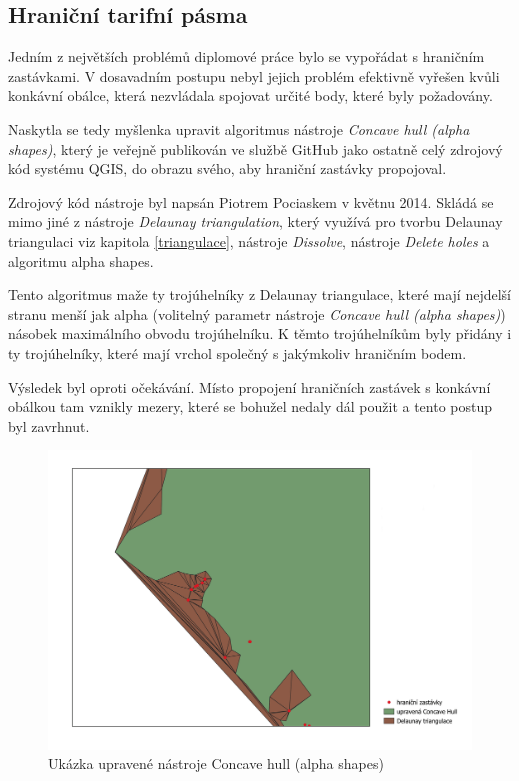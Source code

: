 \subsection{Hraniční tarifní pásma}
\label{hranice}

Jedním z největších problémů diplomové práce bylo se vypořádat s hraničním zastávkami.
V dosavadním postupu nebyl jejich problém efektivně vyřešen kvůli konkávní obálce,
která nezvládala spojovat určité body, které byly požadovány.

Naskytla se tedy myšlenka upravit algoritmus nástroje \textit{Concave hull (alpha shapes)},
který je veřejně publikován ve službě GitHub jako ostatně celý zdrojový kód systému QGIS, do obrazu
svého, aby hraniční zastávky propojoval. 

Zdrojový kód nástroje byl napsán Piotrem Pociaskem v květnu 2014. Skládá se mimo jiné z nástroje
\textit{Delaunay triangulation}, který využívá pro tvorbu Delaunay triangulaci viz kapitola \ref{triangulace},
nástroje \textit{Dissolve}, nástroje \textit{Delete holes} a algoritmu alpha shapes.

Tento algoritmus maže ty trojúhelníky z Delaunay triangulace, které mají nejdelší stranu menší jak alpha (volitelný
parametr nástroje \textit{Concave hull (alpha shapes)}) násobek maximálního obvodu trojúhelníku.
K těmto trojúhelníkům byly přidány i ty trojúhelníky, které mají vrchol společný s jakýmkoliv hraničním bodem.

Výsledek byl oproti očekávání. Místo propojení hraničních zastávek s konkávní obálkou tam vznikly mezery, 
které se bohužel nedaly dál použit a tento postup byl zavrhnut.

\begin{figure}[H] \centering
    \includegraphics[width=400pt]{./pictures/concave_hull_upravena.png}
    \caption[Ukázka upravené nástroje Concave hull (alpha shapes)]{Ukázka upravené nástroje Concave hull (alpha shapes)}
	\label{fig:concave_hull_upravena}              
\end{figure}

